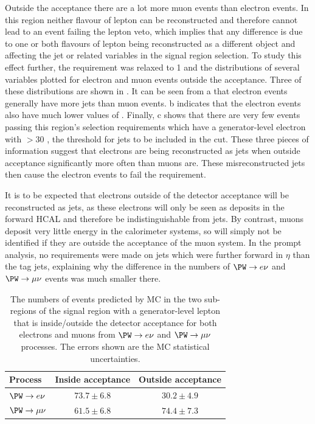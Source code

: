 Outside the acceptance there are a lot more muon events than electron events. In this region neither flavour of lepton can be reconstructed and therefore cannot lead to an event failing the lepton veto, which implies that any difference is due to one or both flavours of lepton being reconstructed as a different object and affecting the jet or \MET related variables in the signal region selection. To study this effect further, the \jetmetdphi requirement was relaxed to 1 and the distributions of several variables plotted for electron and muon events outside the acceptance. Three of these distributions are shown in . It can be seen from a that electron events generally have more jets than muon events. b indicates that the electron events also have much lower values of \jetmetdphi. Finally, c shows that there are very few events passing this region's selection requirements which have a generator-level electron with \pt$>30$ \GeV, the threshold for jets to be included in the \jetmetdphi cut. These three pieces of information suggest that electrons are being reconstructed as jets when outside acceptance significantly more often than muons are. These misreconstructed jets then cause the electron events to fail the \jetmetdphi requirement.

It is to be expected that electrons outside of the detector acceptance will be reconstructed as jets, as these electrons will only be seen as deposits in the forward \ac{HCAL} and therefore be indistinguishable from jets. By contrast, muons deposit very little energy in the calorimeter systems, so will simply not be identified if they are outside the acceptance of the muon system. In the prompt analysis, no requirements were made on jets which were further forward in $\eta$ than the tag jets, explaining why the difference in the numbers of $\PW\rightarrow e\nu$ and $\PW\rightarrow\mu\nu$ events was much smaller there.

\begin{table}
  \caption{The numbers of events predicted by \ac{MC} in the two sub-regions of the signal region with a generator-level lepton that is inside/outside the detector acceptance for both electrons and muons from $\PW\rightarrow e\nu$ and $\PW\rightarrow\mu\nu$ processes. The errors shown are the \ac{MC} statistical uncertainties.}
  \label{tab:enumunudiff}
  \begin{tabular}{lcc}
    \hline
    \hline
    Process & Inside acceptance & Outside acceptance \\
    \hline
    $\PW\rightarrow e\nu$ & $73.7\pm 6.8$ & $30.2\pm 4.9$ \\
    $\PW\rightarrow \mu\nu$ & $61.5\pm 6.8$ & $74.4\pm7.3$ \\
    \hline
    \hline
  \end{tabular}
\end{table}

